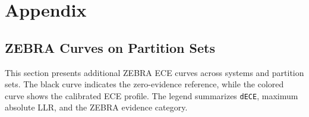 \documentclass[12pt,leqno,a4paper]{article}
\begin{document}









\clearpage
\appendix
\section{Appendix}
\label{app:appendix}

\subsection{ZEBRA Curves on Partition Sets}
\label{app:zebra-curves}

This section presents additional ZEBRA ECE curves across systems and partition sets. The black curve indicates the zero-evidence reference, while the colored curve shows the calibrated ECE profile. The legend summarizes \texttt{dECE}, maximum absolute LLR, and the ZEBRA evidence category.
\end{document}
